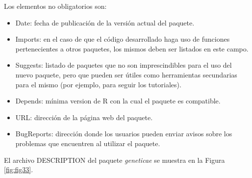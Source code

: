 Los elementos no obligatorios son:
\begin{itemize}
\item Date: fecha de publicación de la versión actual del paquete.
\item Imports: en el caso de que el código desarrollado haga uso de funciones pertenecientes a otros paquetes, los mismos deben ser listados en este campo.
\item Suggests: listado de paquetes que no son imprescindibles para el uso del nuevo paquete, pero que pueden ser útiles como herramientas secundarias para el mismo (por ejemplo, para seguir los tutoriales).
\item Depends: mínima version de R con la cual el paquete es compatible.
\item URL: dirección de la página web del paquete.
\item BugReports: dirección donde los usuarios pueden enviar avisos sobre los problemas que encuentren al utilizar el paquete.
\end{itemize}

El archivo DESCRIPTION del paquete \emph{geneticae} se muestra en la Figura \ref{fig:fig33}.

